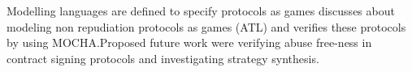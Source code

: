   Modelling languages are defined to specify protocols as games \cite{KSRJ01} discusses about modeling non repudiation protocols as games (ATL) and verifies these protocols by using MOCHA.Proposed future work were verifying abuse free-ness in contract signing protocols and investigating strategy synthesis.

